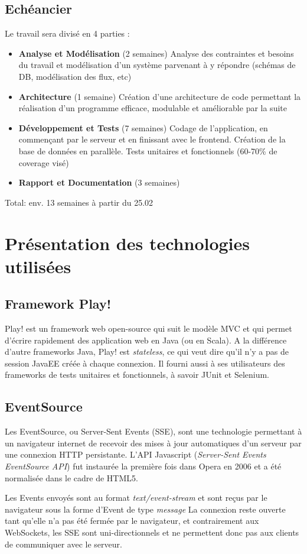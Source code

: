 \documentclass[french]{article}
\begin{document}
\subsection{Echéancier}

Le travail sera divisé en 4 parties :
\begin{itemize}
	\item \textbf{Analyse et Modélisation} (2 semaines) \newline
	Analyse des contraintes et besoins du travail et modélisation d'un système parvenant à y répondre (schémas de DB, modélisation des flux, etc)
	\item \textbf{Architecture} (1 semaine) \newline
	Création d'une architecture de code permettant la réalisation d'un programme efficace, modulable et améliorable par la suite
	\item \textbf{Développement et Tests} (7 semaines) \newline
	Codage de l'application, en commençant par le serveur et en finissant avec le frontend.  
	Création de la base de données en parallèle.
	Tests unitaires et fonctionnels (60-70\% de coverage visé)
	\item \textbf{Rapport et Documentation} (3 semaines) \newline
	\end{itemize}
	
Total: env. 13 semaines à partir du 25.02 \newpage

\newpage
\section{Présentation des technologies utilisées}

\subsection{Framework Play!}
Play! est un framework web open-source qui suit le modèle MVC et qui permet d'écrire rapidement des application web en Java (ou en Scala). A la différence d'autre frameworks Java, Play! est \textit{stateless}, ce qui veut dire qu'il n'y a pas de session JavaEE créée à chaque connexion. 
Il fourni aussi à ses utilisateurs des frameworks de tests unitaires et fonctionnels, à savoir JUnit et Selenium.


\subsection{EventSource}
Les EventSource, ou Server-Sent Events (SSE), sont une technologie permettant à un navigateur internet de recevoir des mises à jour automatiques d'un serveur par une connexion HTTP persistante. L'API Javascript (\textit{Server-Sent Events EventSource API}) fut instaurée la première fois dans Opera en 2006 et a été normalisée dans le cadre de HTML5. \par
Les Events envoyés sont au format \textit{text/event-stream} et sont reçus par le navigateur sous la forme d'Event de type \textit{message} La connexion reste ouverte tant qu'elle n'a pas été fermée par le navigateur, et contrairement aux WebSockets, les SSE sont uni-directionnels et ne permettent donc pas aux clients de communiquer avec le serveur. 
\end{document}
